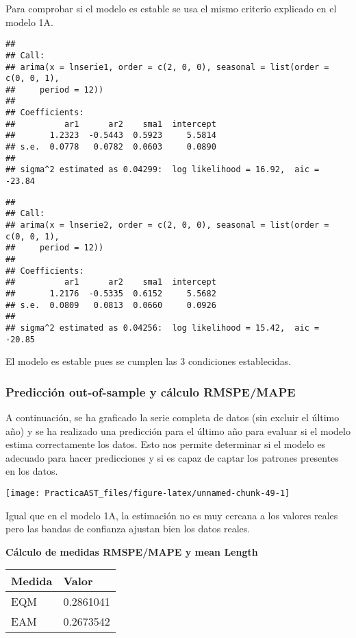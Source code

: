 \documentclass[
]{article}
\begin{document}
Para comprobar si el modelo es estable se usa el mismo criterio
explicado en el modelo 1A.

\begin{verbatim}
## 
## Call:
## arima(x = lnserie1, order = c(2, 0, 0), seasonal = list(order = c(0, 0, 1), 
##     period = 12))
## 
## Coefficients:
##          ar1      ar2    sma1  intercept
##       1.2323  -0.5443  0.5923     5.5814
## s.e.  0.0778   0.0782  0.0603     0.0890
## 
## sigma^2 estimated as 0.04299:  log likelihood = 16.92,  aic = -23.84
\end{verbatim}

\begin{verbatim}
## 
## Call:
## arima(x = lnserie2, order = c(2, 0, 0), seasonal = list(order = c(0, 0, 1), 
##     period = 12))
## 
## Coefficients:
##          ar1      ar2    sma1  intercept
##       1.2176  -0.5335  0.6152     5.5682
## s.e.  0.0809   0.0813  0.0660     0.0926
## 
## sigma^2 estimated as 0.04256:  log likelihood = 15.42,  aic = -20.85
\end{verbatim}

El modelo es estable pues se cumplen las 3 condiciones establecidas.

\hypertarget{predicciuxf3n-out-of-sample-y-cuxe1lculo-rmspemape-1}{%
\subsubsection{Predicción out-of-sample y cálculo
RMSPE/MAPE}\label{predicciuxf3n-out-of-sample-y-cuxe1lculo-rmspemape-1}}

A continuación, se ha graficado la serie completa de datos (sin excluir
el último año) y se ha realizado una predicción para el último año para
evaluar si el modelo estima correctamente los datos. Esto nos permite
determinar si el modelo es adecuado para hacer predicciones y si es
capaz de captar los patrones presentes en los datos.

\begin{center}\texttt{[image: PracticaAST\_files/figure-latex/unnamed-chunk-49-1]} \end{center}

Igual que en el modelo 1A, la estimación no es muy cercana a los valores
reales pero las bandas de confianza ajustan bien los datos reales.

\pagebreak

\textbf{Cálculo de medidas RMSPE/MAPE y mean Length}

\begin{longtable}[]{@{}ll@{}}
\toprule()
Medida & Valor \\
\midrule()
\endhead
EQM & 0.2861041 \\
EAM & 0.2673542 \\
\bottomrule()
\end{longtable}
\end{document}
